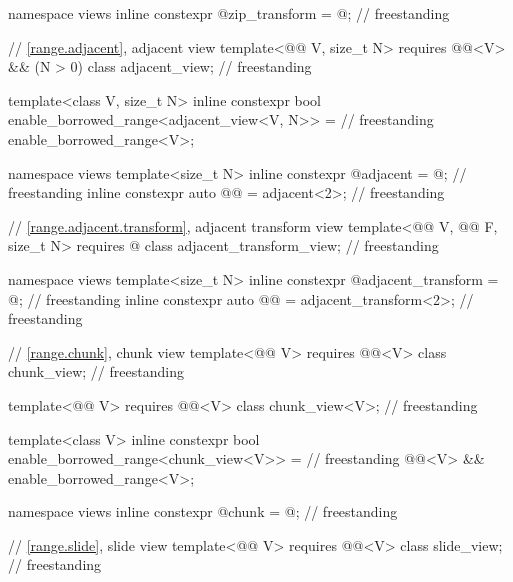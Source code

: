 \begin{codeblock}
{  namespace views { inline constexpr @\unspecnc@ zip_transform = @\unspecnc@; }     // freestanding

  // \ref{range.adjacent}, adjacent view
  template<@@ V, size_t N>
    requires @@<V> && (N > 0)
  class adjacent_view;                                                              // freestanding

  template<class V, size_t N>
    inline constexpr bool enable_borrowed_range<adjacent_view<V, N>> =              // freestanding
      enable_borrowed_range<V>;

  namespace views {
    template<size_t N>
      inline constexpr @\unspecnc@ adjacent = @\unspecnc@;                          // freestanding
    inline constexpr auto @@ = adjacent<2>;                                   // freestanding
  }

  // \ref{range.adjacent.transform}, adjacent transform view
  template<@@ V, @@ F, size_t N>
    requires @\seebelow@
  class adjacent_transform_view;                                                    // freestanding

  namespace views {
    template<size_t N>
      inline constexpr @\unspecnc@ adjacent_transform = @\unspecnc@;                // freestanding
    inline constexpr auto @@ = adjacent_transform<2>;               // freestanding
  }

  // \ref{range.chunk}, chunk view
  template<@@ V>
    requires @@<V>
  class chunk_view;                                                                 // freestanding

  template<@@ V>
    requires @@<V>
  class chunk_view<V>;                                                              // freestanding

  template<class V>
    inline constexpr bool enable_borrowed_range<chunk_view<V>> =                    // freestanding
      @@<V> && enable_borrowed_range<V>;

  namespace views { inline constexpr @\unspecnc@ chunk = @\unspecnc@; }             // freestanding

  // \ref{range.slide}, slide view
  template<@@ V>
    requires @@<V>
  class slide_view;                                                                 // freestanding

}
\end{codeblock}

